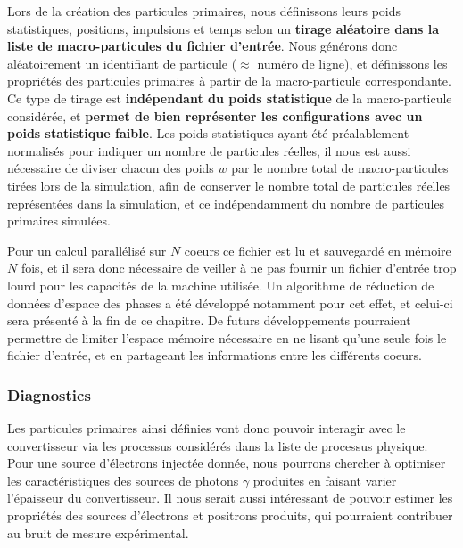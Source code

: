 \begin{refsection}
Lors de la création des particules primaires, nous définissons leurs poids statistiques, positions, impulsions et temps selon un \textbf{tirage aléatoire dans la liste de macro-particules du fichier d'entrée}. Nous générons donc aléatoirement un identifiant de particule ($\approx$ numéro de ligne), et définissons les propriétés des particules primaires à partir de la macro-particule correspondante. Ce type de tirage est \textbf{indépendant du poids statistique} de la macro-particule considérée, et \textbf{permet de bien représenter les configurations avec un poids statistique faible}. Les poids statistiques ayant été préalablement normalisés pour indiquer un nombre de particules réelles, il nous est aussi nécessaire de diviser chacun des poids $w$ par le nombre total de macro-particules tirées lors de la simulation, afin de conserver le nombre total de particules réelles représentées dans la simulation, et ce indépendamment du nombre de particules primaires simulées.

Pour un calcul parallélisé sur $N$ coeurs ce fichier est lu et sauvegardé en mémoire $N$ fois, et il sera donc nécessaire de veiller à ne pas fournir un fichier d'entrée trop lourd pour les capacités de la machine utilisée. Un algorithme de réduction de données d'espace des phases a été développé notamment pour cet effet, et celui-ci sera présenté à la fin de ce chapitre. De futurs développements pourraient permettre de limiter l'espace mémoire nécessaire en ne lisant qu'une seule fois le fichier d'entrée, et en partageant les informations entre les différents coeurs.

\subsubsection{Diagnostics}

Les particules primaires ainsi définies vont donc pouvoir interagir avec le convertisseur via les processus considérés dans la liste de processus physique. Pour une source d'électrons injectée donnée, nous pourrons chercher à optimiser les caractéristiques des sources de photons $\gamma$ produites en faisant varier l'épaisseur du convertisseur. Il nous serait aussi intéressant de pouvoir estimer les propriétés des sources d'électrons et positrons produits, qui pourraient contribuer au bruit de mesure expérimental. 


\end{refsection}
